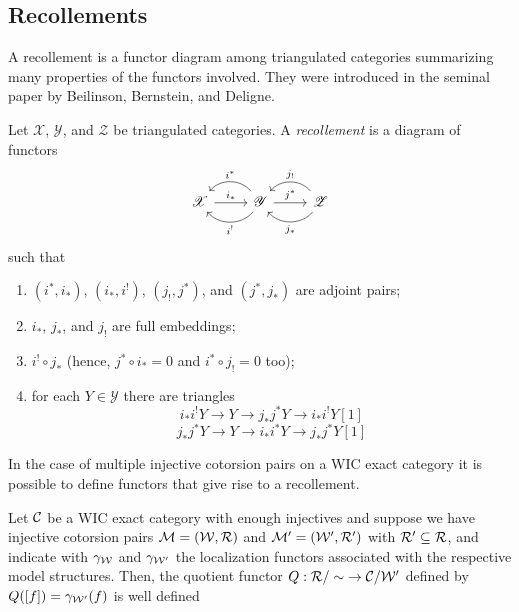 \subsection{Recollements}

A recollement is a functor diagram among triangulated categories summarizing many properties of the functors involved. They were introduced in the seminal paper \cite{bbd82} by Beilinson, Bernstein, and Deligne.

\begin{defn}\label{def:recoll}
  Let $\mathscr{X}$, $\mathscr{Y}$, and $\mathscr{Z}$ be triangulated categories. A \emph{recollement} is a diagram of functors
  \begin{equation*}
    \begin{tikzcd}
      \mathscr{X}\arrow{r}{i_\ast}
      & \mathscr{Y}\arrow[bend left=50]{l}{i^!}\arrow[bend right=50]{l}[']{i^\ast}\arrow{r}{j^\ast}
      & \mathscr{Z}\arrow[bend left=50]{l}{j_\ast}\arrow[bend right=50]{l}[']{j_!}
    \end{tikzcd}
  \end{equation*}
  such that
  \begin{enumerate}[label=(\arabic*)]
    \item $(i^\ast,i_\ast)$, $(i_\ast,i^!)$, $(j_!,j^\ast)$, and $(j^\ast,j_\ast)$ are adjoint pairs;
    \item $i_\ast$, $j_\ast$, and $j_!$ are full embeddings;
    \item $i^!\circ j_\ast$ (hence, $j^\ast\circ i_\ast=0$ and $i^\ast\circ j_!=0$ too);
    \item for each $Y\in\mathscr{Y}$ there are triangles
      \[
        i_\ast i^! Y\to Y\to j_\ast j^\ast Y\to i_\ast i^! Y[1]
      \]
      \[
        j_\ast j^\ast Y\to Y\to i_\ast i^\ast Y\to j_\ast j^\ast Y[1]
      \]
  \end{enumerate}
\end{defn}

In the case of multiple injective cotorsion pairs on a WIC exact category it is possible to define functors that give rise to a recollement.

\begin{lem}{\cite[Lemma~3.3]{G7}}\label{lemma:gill_quotient_functor}
  \begin{sloppypar}
  Let $\mathcal{C}$ be a WIC exact category with enough injectives and suppose we have injective cotorsion pairs ${\mathcal{M}=(\mathcal{W},\mathcal{R})}$ and $\mathcal{M}'=(\mathcal{W}',\mathcal{R}')$ with $\mathcal{R}'\subseteq \mathcal{R}$, and indicate with $\gamma_{\mathcal{W}}$ and $\gamma_{\mathcal{W}'}$ the localization functors associated with the respective model structures. Then, the quotient functor $Q:{\mathcal{R}/\sim}\to \mathcal{C}/\mathcal{W}'$ defined by $Q([f])=\gamma_{\mathcal{W}'}(f)$ is well defined
  \end{sloppypar}
\end{lem}

